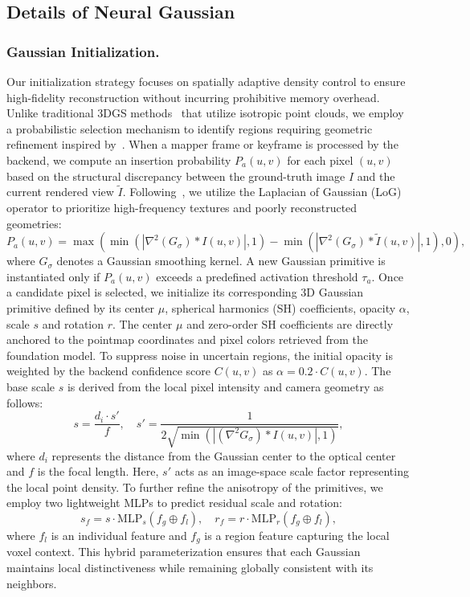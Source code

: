 \subsection{Details of Neural Gaussian}
\label{sec:neural_gaussians}

\subsubsection{Gaussian Initialization.} Our initialization strategy focuses on spatially adaptive density control to ensure high-fidelity reconstruction without incurring prohibitive memory overhead. Unlike traditional 3DGS methods~\cite{kerbl20233d} that utilize isotropic point clouds, we employ a probabilistic selection mechanism to identify regions requiring geometric refinement inspired by~\cite{lu2024scaffold, ren2024octree}. When a mapper frame or keyframe is processed by the backend, we compute an insertion probability $P_a(u, v)$ for each pixel $(u, v)$ based on the structural discrepancy between the ground-truth image $I$ and the current rendered view $\tilde{I}$. Following~\cite{meuleman2025fly}, we utilize the Laplacian of Gaussian (LoG) operator to prioritize high-frequency textures and poorly reconstructed geometries:
\begin{equation}
P_a(u, v) = \max \left( \min(| \nabla^2(G_\sigma) * I(u,v) |, 1) - \min(| \nabla^2(G_\sigma) * \tilde{I}(u,v) |, 1), 0 \right),
\end{equation}
where $G_\sigma$ denotes a Gaussian smoothing kernel. A new Gaussian primitive is instantiated only if $P_a(u, v)$ exceeds a predefined activation threshold $\tau_a$.
Once a candidate pixel is selected, we initialize its corresponding 3D Gaussian primitive defined by its center $\mu$, spherical harmonics (SH) coefficients, opacity $\alpha$, scale $s$ and rotation $r$. The center $\mu$ and zero-order SH coefficients are directly anchored to the pointmap coordinates and pixel colors retrieved from the foundation model. To suppress noise in uncertain regions, the initial opacity is weighted by the backend confidence score $C(u, v)$ as $\alpha = 0.2 \cdot C(u, v)$. The base scale $s$ is derived from the local pixel intensity and camera geometry as follows:
\begin{equation}
s = \frac{d_i \cdot s'}{f}, \quad s' = \frac{1}{2 \sqrt{\min(| (\nabla^2 G_\sigma) * I(u, v) |, 1)}},\end{equation}
where $d_i$ represents the distance from the Gaussian center to the optical center and $f$ is the focal length. Here, $s'$ acts as an image-space scale factor representing the local point density. To further refine the anisotropy of the primitives, we employ two lightweight MLPs to predict residual scale and rotation:
\begin{equation}
s_f = s \cdot \text{MLP}_s(f_g \oplus f_l), \quad r_f = r \cdot \text{MLP}_r(f_g \oplus f_l),
\end{equation}
where $f_l$ is an individual feature and $f_g$ is a region feature capturing the local voxel context. This hybrid parameterization ensures that each Gaussian maintains local distinctiveness while remaining globally consistent with its neighbors.

